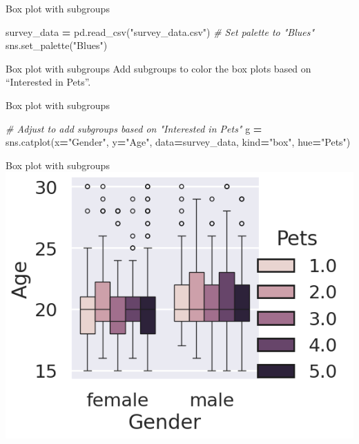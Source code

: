 \documentclass[
  ignorenonframetext,
]{beamer}
\newenvironment{Shaded}{\begin{snugshade}}{\end{snugshade}}
\newcommand{\CommentTok}[1]{\textcolor[rgb]{0.56,0.35,0.01}{\textit{#1}}}
\newcommand{\NormalTok}[1]{#1}
\newcommand{\OperatorTok}[1]{\textcolor[rgb]{0.81,0.36,0.00}{\textbf{#1}}}
\newcommand{\StringTok}[1]{\textcolor[rgb]{0.31,0.60,0.02}{#1}}
\begin{document}
\begin{frame}[fragile]{Box plot with subgroups}
\label{box-plot-with-subgroups-3}

\begin{Shaded}
\begin{Highlighting}[]
\NormalTok{survey\_data }\OperatorTok{=}\NormalTok{ pd.read\_csv(}\StringTok{"survey\_data.csv"}\NormalTok{)}
\CommentTok{\# Set palette to "Blues"}
\NormalTok{sns.set\_palette(}\StringTok{"Blues"}\NormalTok{)}
\end{Highlighting}
\end{Shaded}
\end{frame}

\begin{frame}{Box plot with subgroups}
\label{box-plot-with-subgroups-4}
Add subgroups to color the box plots based on ``Interested in Pets''.
\end{frame}

\begin{frame}[fragile]{Box plot with subgroups}
\label{box-plot-with-subgroups-5}

\begin{Shaded}
\begin{Highlighting}[]
\CommentTok{\# Adjust to add subgroups based on "Interested in Pets"}
\NormalTok{g }\OperatorTok{=}\NormalTok{ sns.catplot(x}\OperatorTok{=}\StringTok{"Gender"}\NormalTok{,}
\NormalTok{                y}\OperatorTok{=}\StringTok{"Age"}\NormalTok{, data}\OperatorTok{=}\NormalTok{survey\_data, }
\NormalTok{                kind}\OperatorTok{=}\StringTok{"box"}\NormalTok{, hue}\OperatorTok{=}\StringTok{"Pets"}\NormalTok{)}
\end{Highlighting}
\end{Shaded}
\end{frame}

\begin{frame}{Box plot with subgroups}
\label{box-plot-with-subgroups-6}
\includegraphics{../images/im309.png}
\end{frame}
\end{document}
